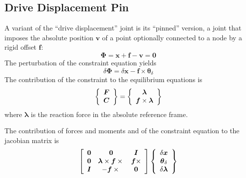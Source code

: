 \documentclass[10pt,dvips,fleqn]{report}
\newcommand{\T}[1]{\boldsymbol{#1}}
\begin{document}
\subsection{Drive Displacement Pin}
A variant of the ``drive displacement'' joint is its ``pinned'' version,
a joint that imposes the absolute position $\T{v}$ of a point
optionally connected to a node by a rigid offset $\T{f}$:
\begin{equation}
		\T{\Phi} = \T{x} + \T{f} - \T{v} = \T{0}
\end{equation}
The perturbation of the constraint equation yields
\begin{equation}
	\delta\T{\Phi} = 
	\delta\T{x} - \T{f}\times \T{\theta}_{\delta}
\end{equation}
The contribution of the constraint to the equilibrium equations is
\begin{equation}
	\cubr{\cvvect{
		\T{F} \\
		\T{C}
	}} = \cubr{\cvvect{
		\T{\lambda} \\
		\T{f}\times \T{\lambda}
	}}
\end{equation}
where $\T{\lambda}$ is the reaction force in the absolute reference frame.

The contribution of forces and moments and of the constraint equation 
to the jacobian matrix is
\begin{equation}
	\sqbr{\matr{ccc}{
		\T{0} &
			\T{0} &
			\T{I} \\
		\T{0} &
			\T{\lambda}\times\T{f}\times{} &
			\T{f}\times \\
		\T{I} &
			- \T{f}\times{} &
			\T{0}
	}}\cubr{\cvvect{
		\delta\T{x} \\
		\T{\theta}_{\delta} \\
		\delta\T{\lambda}
	}}
\end{equation}
\end{document}
